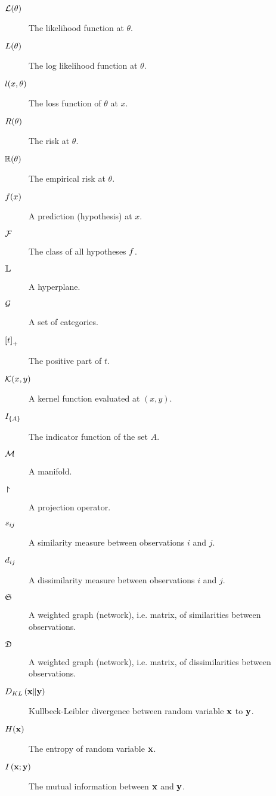 \begin{description}
\item[$\mathcal{L}(\theta)$] The likelihood function at $\theta$.
\item[$L(\theta)$] The log likelihood function at $\theta$.
\item[$l(x,\theta)$] The loss function of $\theta$ at $x$.
\item[$R(\theta)$]  The risk at $\theta$.
\item[$\mathbb{R}(\theta)$] The empirical risk at $\theta$.
\item[$f(x)$] A prediction (hypothesis) at $x$.
\item[$\mathcal{F}$] The class of all hypotheses $f$.
\item[$\mathbb{L}$] A hyperplane.
\item[$\mathcal{G}$] A set of categories. 
\item[$\left[ t \right]_+$] The positive part of $t$.
\item[$\mathcal{K}(x,y)$] A kernel function evaluated at $(x,y)$.
\item[$I_{\left\{ A \right\}}$] The indicator function of the set $A$.
\item[$\mathcal{M}$] A manifold.
\item[$\project$] A projection operator.

\item[$s_{ij}$] A similarity measure between observations $i$ and $j$. 
\item[$d_{ij}$] A dissimilarity measure between observations $i$ and $j$. 
\item[$\mathfrak{S}$] A weighted graph (network), i.e. matrix, of similarities between observations. 
\item[$\mathfrak{D}$] A weighted graph (network), i.e. matrix, of dissimilarities between observations. 

\item[$D_{KL}\left(\mathbf{x} \Vert \mathbf{y} \right)$] Kullbeck-Leibler divergence between random variable $\mathbf{x}$ to $\mathbf{y}$.
\item[$H(\mathbf{x})$] The entropy of random variable $\mathbf{x}$.
\item[$I\left(\mathbf{x};\mathbf{y}\right)$] The mutual information between $\mathbf{x}$ and $\mathbf{y}$.


\end{description}



